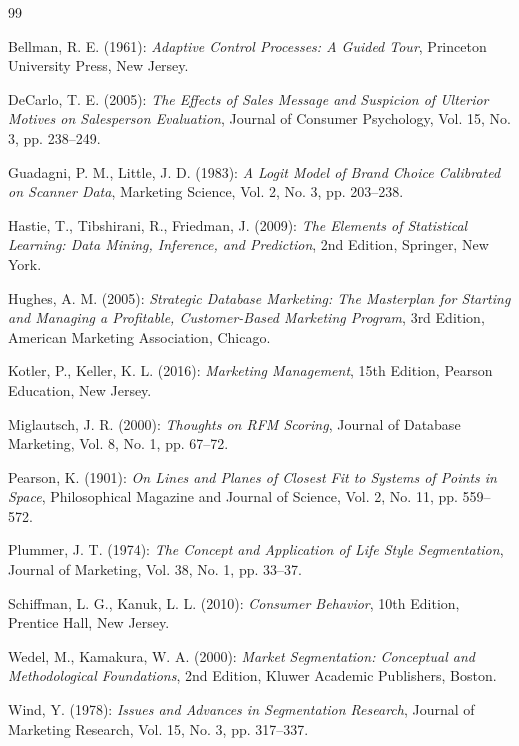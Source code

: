 \documentclass[12pt,a4paper,oneside]{report}
\begin{document}
\begin{thebibliography}{99}

 Bellman, R. E. (1961): \textit{Adaptive Control Processes: A Guided Tour}, Princeton University Press, New Jersey.

 DeCarlo, T. E. (2005): \textit{The Effects of Sales Message and Suspicion of Ulterior Motives on Salesperson Evaluation}, Journal of Consumer Psychology, Vol. 15, No. 3, pp. 238--249.

 Guadagni, P. M., Little, J. D. (1983): \textit{A Logit Model of Brand Choice Calibrated on Scanner Data}, Marketing Science, Vol. 2, No. 3, pp. 203--238.

 Hastie, T., Tibshirani, R., Friedman, J. (2009): \textit{The Elements of Statistical Learning: Data Mining, Inference, and Prediction}, 2nd Edition, Springer, New York.

 Hughes, A. M. (2005): \textit{Strategic Database Marketing: The Masterplan for Starting and Managing a Profitable, Customer-Based Marketing Program}, 3rd Edition, American Marketing Association, Chicago.

 Kotler, P., Keller, K. L. (2016): \textit{Marketing Management}, 15th Edition, Pearson Education, New Jersey.

 Miglautsch, J. R. (2000): \textit{Thoughts on RFM Scoring}, Journal of Database Marketing, Vol. 8, No. 1, pp. 67--72.

 Pearson, K. (1901): \textit{On Lines and Planes of Closest Fit to Systems of Points in Space}, Philosophical Magazine and Journal of Science, Vol. 2, No. 11, pp. 559--572.

 Plummer, J. T. (1974): \textit{The Concept and Application of Life Style Segmentation}, Journal of Marketing, Vol. 38, No. 1, pp. 33--37.

 Schiffman, L. G., Kanuk, L. L. (2010): \textit{Consumer Behavior}, 10th Edition, Prentice Hall, New Jersey.

 Wedel, M., Kamakura, W. A. (2000): \textit{Market Segmentation: Conceptual and Methodological Foundations}, 2nd Edition, Kluwer Academic Publishers, Boston.

 Wind, Y. (1978): \textit{Issues and Advances in Segmentation Research}, Journal of Marketing Research, Vol. 15, No. 3, pp. 317--337.

\end{thebibliography}

\end{document}

